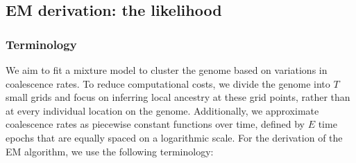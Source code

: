 \subsection{EM derivation: the likelihood}
\subsubsection{Terminology}
\label{terminology}
We aim to fit a mixture model to cluster the genome based on variations in coalescence rates. To reduce computational costs, we divide the genome into $T$ small grids and focus on inferring local ancestry at these grid points, rather than at every individual location on the genome. Additionally, we approximate coalescence rates as piecewise constant functions over time, defined by $E$ time epochs that are equally spaced on a logarithmic scale. For the derivation of the EM algorithm, we use the following terminology:
